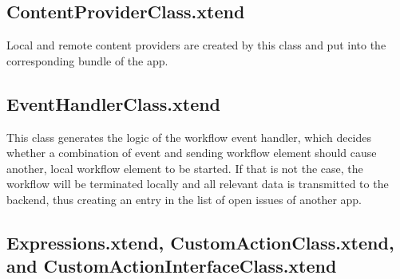 \subsection{ContentProviderClass.xtend}
Local and remote content providers are created by this class and put into the corresponding bundle of the app.

\subsection{EventHandlerClass.xtend}
This class generates the logic of the workflow event handler, which decides whether a combination of event and sending workflow element should cause another, local workflow element to be started. If that is not the case, the workflow will be terminated locally and all relevant data is transmitted to the backend, thus creating an entry in the list of open issues of another app.

\subsection{Expressions.xtend, CustomActionClass.xtend, and CustomActionInterfaceClass.xtend}
